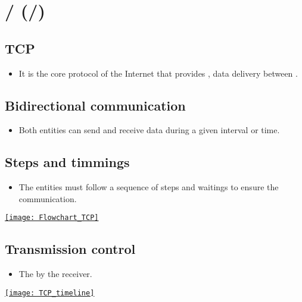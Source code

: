 \chapter{/ (/)}

\section{\gls{TCP}}
\begin{itemize}
\item It is the core protocol of the Internet that provides
  , data delivery between
  \cite{wikipedia_TCP}.
\end{itemize}

\section{Bidirectional communication}
\begin{itemize}
\item Both entities can send and receive data during a given interval or time.
\end{itemize}

\section{Steps and timmings}
\begin{itemize} 
\item The entities must follow a sequence of steps and waitings to ensure the communication.
\end{itemize}
\vspace{-2ex}
\begin{center}
  \href{https://www.ibm.com/support/pages/flowchart-tcp-connections-and-their-definition}{\texttt{[image: Flowchart\_TCP]}}
\end{center}

\section{Transmission control}
\begin{itemize} 
\item The  by the receiver.
\end{itemize}
\vspace{-2ex}
\begin{center}
  \href{https://ieeexplore.ieee.org/document/8668433}{\texttt{[image: TCP\_timeline]}}
\end{center}

